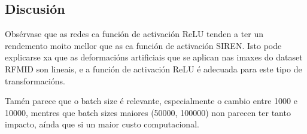 




\subsection{Discusión}
\label{subsec:Discusion-batchsize}

Obsérvase que as redes ca función de activación ReLU tenden a ter un rendemento moito mellor que as ca función de activación SIREN. Isto pode explicarse xa que as deformacións artificiais que se aplican nas imaxes do dataset RFMID son lineais, e a función de activación ReLU é adecuada para este tipo de transformacións.

Tamén parece que o batch size é relevante, especialmente o cambio entre 1000 e 10000, mentres que batch sizes maiores (50000, 100000) non parecen ter tanto impacto, aínda que si un maior custo computacional. 

